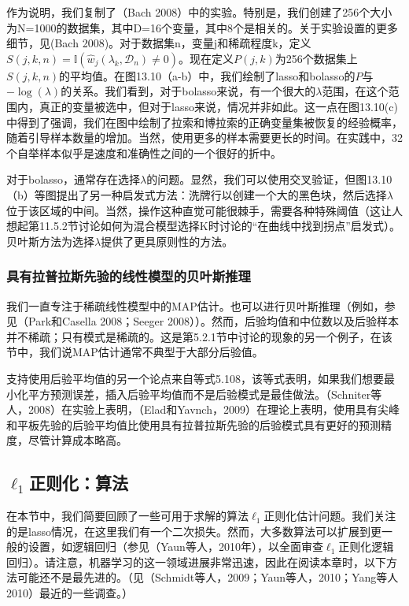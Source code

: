 \documentclass[a4paper]{article}
\begin{document}
作为说明，我们复制了（Bach 2008）中的实验。特别是，我们创建了256个大小为N=1000的数据集，其中D=16个变量，其中8个是相关的。关于实验设置的更多细节，见(Bach 2008)。对于数据集n，变量j和稀疏程度k，定义$S(j,k,n)=\mathbb{I}(\hat{w}_j(\lambda_k,\mathcal{D}_n)\ne 0)$。现在定义$P(j,k)$为256个数据集上$S(j,k,n)$的平均值。在图13.10（a-b）中，我们绘制了lasso和bolasso的$P$与$-\log (\lambda)$的关系。我们看到，对于bolasso来说，有一个很大的$\lambda$范围，在这个范围内，真正的变量被选中，但对于lasso来说，情况并非如此。这一点在图13.10(c)中得到了强调，我们在图中绘制了拉索和博拉索的正确变量集被恢复的经验概率，随着引导样本数量的增加。当然，使用更多的样本需要更长的时间。在实践中，32个自举样本似乎是速度和准确性之间的一个很好的折中。

对于bolasso，通常存在选择$\lambda$的问题。显然，我们可以使用交叉验证，但图13.10（b）等图提出了另一种启发式方法：洗牌行以创建一个大的黑色块，然后选择$\lambda$位于该区域的中间。当然，操作这种直觉可能很棘手，需要各种特殊阈值（这让人想起第11.5.2节讨论如何为混合模型选择K时讨论的“在曲线中找到拐点”启发式）。贝叶斯方法为选择$\lambda$提供了更具原则性的方法。

\subsubsection{具有拉普拉斯先验的线性模型的贝叶斯推理}
我们一直专注于稀疏线性模型中的MAP估计。也可以进行贝叶斯推理（例如，参见（Park和Casella 2008；Seeger 2008））。然而，后验均值和中位数以及后验样本并不稀疏；只有模式是稀疏的。这是第5.2.1节中讨论的现象的另一个例子，在该节中，我们说MAP估计通常不典型于大部分后验值。

支持使用后验平均值的另一个论点来自等式5.108，该等式表明，如果我们想要最小化平方预测误差，插入后验平均值而不是后验模式是最佳做法。（Schniter等人，2008）在实验上表明，（Elad和Yavnch，2009）在理论上表明，使用具有尖峰和平板先验的后验平均值比使用具有拉普拉斯先验的后验模式具有更好的预测精度，尽管计算成本略高。

\subsection{$\ell_1$正则化：算法}
在本节中，我们简要回顾了一些可用于求解的算法$\ell_1$正则化估计问题。我们关注的是lasso情况，在这里我们有一个二次损失。然而，大多数算法可以扩展到更一般的设置，如逻辑回归（参见（Yaun等人，2010年），以全面审查$\ell_1$正则化逻辑回归）。请注意，机器学习的这一领域进展非常迅速，因此在阅读本章时，以下方法可能还不是最先进的。（见（Schmidt等人，2009；Yaun等人，2010；Yang等人2010）最近的一些调查。）
\end{document}
